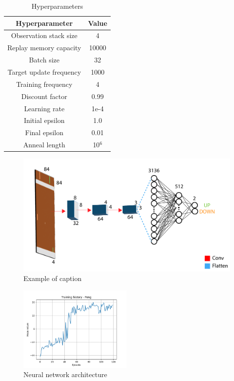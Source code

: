 \documentclass[a4paper,10pt]{article}
\begin{document}
\begin{table}[ht]
\centering
\begin{tabular}{|c|c|}
\hline
\textbf{Hyperparameter} & \textbf{Value} \\
\hline
Observation stack size & 4 \\
Replay memory capacity & 10000 \\
Batch size & 32 \\
Target update frequency & 1000 \\
Training frequency & 4 \\
Discount factor & 0.99 \\
Learning rate & 1e-4 \\
Initial epsilon & 1.0 \\
Final epsilon & 0.01 \\
Anneal length & 10$^6$ \\
\hline
\end{tabular}
\caption{Hyperparameters}
\label{tab:hyperparameters}
\end{table}

\begin{figure}[ht!]
\centering
\includegraphics[width=130mm]{figures/DQN.pdf}
\caption{Example of caption}
\label{fig:arcpong}
\end{figure}


\begin{figure}[ht!]
\centering
\includegraphics[width=0.5\textwidth]{figures/Pong_history_1.png}
\caption{Neural network architecture}
\label{fig:pongresult}
\end{figure}
\end{document}
